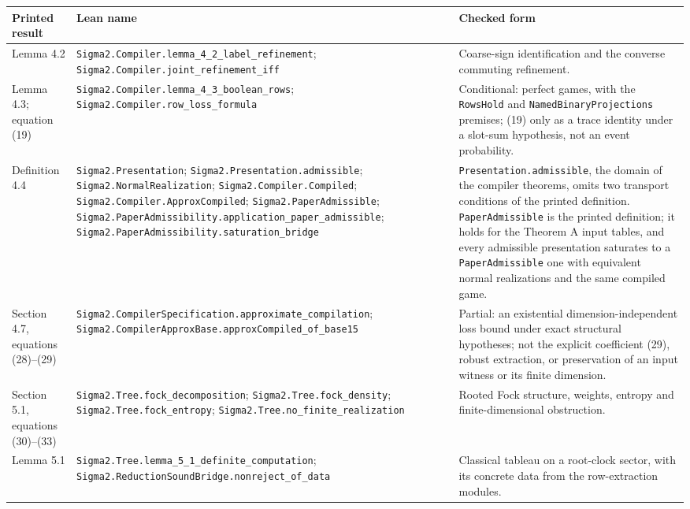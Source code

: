 \begin{center}\footnotesize
\begin{minipage}{\linewidth}
\setlength{\tabcolsep}{4pt}
\begin{tabular}{@{}>{\raggedright\arraybackslash}p{.17\linewidth}>{\raggedright\arraybackslash}p{.44\linewidth}>{\raggedright\arraybackslash}p{.33\linewidth}@{}}
\toprule Printed result & Lean name & Checked form\\\midrule
Lemma 4.2 &
\nolinkurl{Sigma2.Compiler.lemma_4_2_label_refinement};
\nolinkurl{Sigma2.Compiler.joint_refinement_iff} &
Coarse-sign identification and the converse commuting refinement.\\[4pt]
Lemma 4.3; equation (19) &
\nolinkurl{Sigma2.Compiler.lemma_4_3_boolean_rows};
\nolinkurl{Sigma2.Compiler.row_loss_formula} &
Conditional: perfect games, with the \texttt{RowsHold} and
\texttt{NamedBinaryProjections} premises; (19) only as a trace
identity under a slot-sum hypothesis, not an event probability.\\[4pt]
Definition 4.4 &
\nolinkurl{Sigma2.Presentation};
\nolinkurl{Sigma2.Presentation.admissible};
\nolinkurl{Sigma2.NormalRealization};
\nolinkurl{Sigma2.Compiler.Compiled};
\nolinkurl{Sigma2.Compiler.ApproxCompiled};
\nolinkurl{Sigma2.PaperAdmissible};
\nolinkurl{Sigma2.PaperAdmissibility.application_paper_admissible};
\nolinkurl{Sigma2.PaperAdmissibility.saturation_bridge} &
\texttt{Presentation.admissible}, the domain of the compiler theorems,
omits two transport conditions of the printed definition.
\texttt{PaperAdmissible} is the printed definition; it holds for the
Theorem A input tables, and every admissible presentation saturates to a
\texttt{PaperAdmissible} one with equivalent normal realizations and the
same compiled game.\\[4pt]
Section 4.7, equations (28)--(29) &
\nolinkurl{Sigma2.CompilerSpecification.approximate_compilation};
\nolinkurl{Sigma2.CompilerApproxBase.approxCompiled_of_base15} &
Partial: an existential dimension-independent loss bound under exact
structural hypotheses; not the explicit coefficient (29), robust
extraction, or preservation of an input witness or its finite
dimension.\\[4pt]
Section 5.1, equations (30)--(33) &
\nolinkurl{Sigma2.Tree.fock_decomposition};
\nolinkurl{Sigma2.Tree.fock_density};
\nolinkurl{Sigma2.Tree.fock_entropy};
\nolinkurl{Sigma2.Tree.no_finite_realization} &
Rooted Fock structure, weights, entropy and finite-dimensional
obstruction.\\[4pt]
Lemma 5.1 &
\nolinkurl{Sigma2.Tree.lemma_5_1_definite_computation};
\nolinkurl{Sigma2.ReductionSoundBridge.nonreject_of_data} &
Classical tableau on a root-clock sector, with its concrete data from
the row-extraction modules.\\
\bottomrule
\end{tabular}
\end{minipage}
\end{center}

